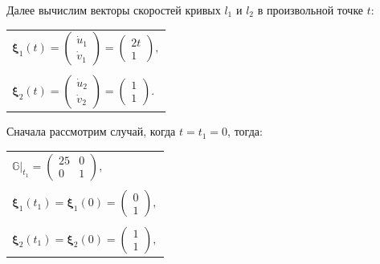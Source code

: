 \documentclass[12pt,a4paper]{article}
\newcommand{\boldVec}[1]{\mathbf #1}
\begin{document}
    Далее вычислим векторы скоростей кривых $ l_1 $ и $ l_2 $ в произвольной точке $ t \colon $
    \begin{table}[h]
        \centering
        \begin{tabular}{l}
            $ \boldVec \xi_1(t)  = 
                \begin{pmatrix}
                    \dot u_1
                    \\
                    \dot v_1
                \end{pmatrix}
            =
                \begin{pmatrix}
                    2t
                    \\
                    1
                \end{pmatrix}\! ,
            $ 
            \\ \\
            $ \boldVec \xi_2(t)  = 
                \begin{pmatrix}
                    \dot u_2
                    \\
                    \dot v_2
                \end{pmatrix}
            =
                \begin{pmatrix}
                    1
                    \\
                    1
                \end{pmatrix}\! .
            $ 
        \end{tabular}
    \end{table}
    
    Сначала рассмотрим случай, когда $t = t_1 = 0$, тогда:
    \begin{table}[h]
        \centering
        \begin{tabular}{l}
            $ \mathbb{G}|_{t_1} = 
                \begin{pmatrix}
                    25 & 0
                    \\
                    0  & 1
                \end{pmatrix}\! ,
            $
            \\ \\
            $ \boldVec \xi_1(t_1) = \boldVec \xi_1(0) = 
                \begin{pmatrix}
                    0
                    \\
                    1
                \end{pmatrix}\! ,
            $ 
            \\ \\
            $ \boldVec \xi_2(t_1) = \boldVec \xi_2(0) = 
                \begin{pmatrix}
                    1
                    \\
                    1
                \end{pmatrix}\! ,
            $ 
        \end{tabular}
    \end{table}
\end{document}
